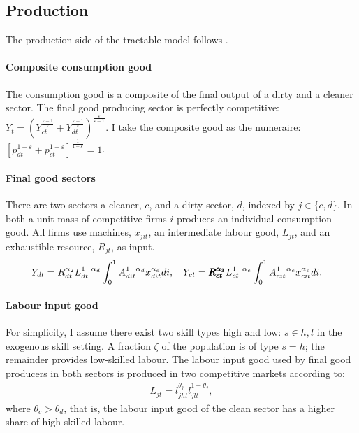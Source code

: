 \subsection{Production}
The production side of the tractable model follows \cite{Acemoglu2012TheChange}. 
\paragraph{Composite consumption good}
The consumption good is a composite of the final output of a dirty and a cleaner sector. The final good producing sector is perfectly competitive:
$Y_t=\left(Y_{ct}^{\frac{\varepsilon-1}{\varepsilon}}+Y_{dt}^{\frac{\varepsilon-1}{\varepsilon}}\right)^\frac{\varepsilon}{\varepsilon-1}$. 
I take the composite good as the numeraire: $\left[p_{dt}^{1-\varepsilon}+p_{ct}^{1-\varepsilon}\right]^{\frac{1}{1-\varepsilon}}=1$.
\paragraph{Final good sectors}
There are two sectors a cleaner, $c$, and a dirty sector, $d$,  indexed by $j\in\{c,d\}$. In both a unit mass of competitive firms $i$ produces an individual consumption good. All firms use machines, $x_{jit}$, an intermediate labour good, $L_{jt}$, and an exhaustible resource, $R_{jt}$, as input. 
\begin{align*}
&Y_{dt}=R_{dt}^{\alpha_2} L_{dt}^{1-\alpha_d}\int_{0}^{1}A_{dit}^{1-\alpha_d}x_{dit}^{\alpha_d} di,\ \hspace{2mm} Y_{ct}=\pmb{R_{ct}^{\alpha_3}} L_{ct}^{1-\alpha_c}\int_{0}^{1}A_{cit}^{1-\alpha_c}x_{cit}^{\alpha_c} di.
\end{align*}

\paragraph{Labour input good}
For simplicity, I assume there exist two skill types high and low: $s \in {h,l}$ in the exogenous skill setting. A fraction $\zeta$ of the population is of type $s=h$; the remainder provides low-skilled labour. 
The labour input good used by final good producers in both sectors is produced in two competitive markets according to:
\begin{align}
L_{jt}=l_{jht}^{\theta_j}l_{jlt}^{1-\theta_j},
\end{align}
where $\theta_c>\theta_d$, that is, the labour input good of the clean sector has a higher share of high-skilled labour.

